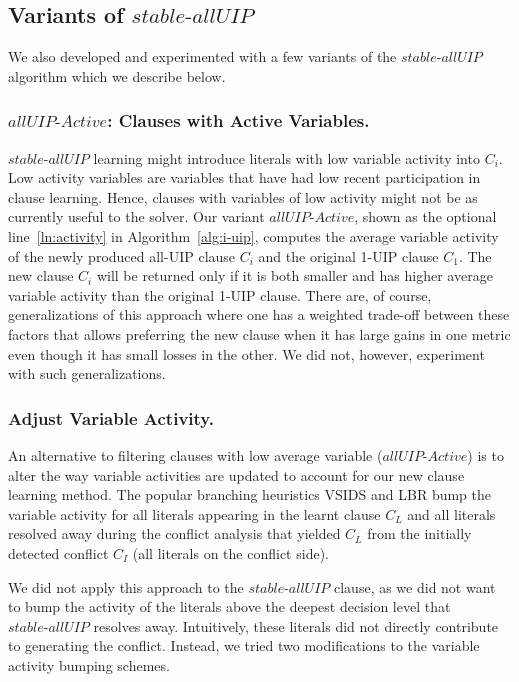 \documentclass[runningheads]{llncs}
\newcommand{\allUip}{\textit{stable-allUIP}}
\newcommand{\allUipAct}{\textit{allUIP-Active}}
\begin{document}
\subsection{Variants of $\allUip$}
We also developed and experimented with a few variants of the
$\allUip$ algorithm which we describe below.

\subsubsection{$\allUipAct$: Clauses with Active
  Variables.} \label{sec:active} $\allUip$ learning might introduce
literals with low variable activity into $C_i$. Low activity variables
are variables that have had low recent participation in clause
learning. Hence, clauses with variables of low activity might not be
as currently useful to the solver. Our variant $\allUipAct$, shown as
the optional line~\ref{ln:activity} in Algorithm~\ref{alg:i-uip},
computes the average variable activity of the newly produced all-UIP
clause $C_i$ and the original 1-UIP clause $C_1$. The new clause $C_i$
will be returned only if it is both smaller and has higher average
variable activity than the original 1-UIP clause. There are, of
course, generalizations of this approach where one has a weighted
trade-off between these factors that allows preferring the new clause
when it has large gains in one metric even though it has small losses
in the other. We did not, however, experiment with such
generalizations.

\subsubsection{Adjust Variable Activity.} \label{sec: varajust} An
alternative to filtering clauses with low average variable
($\allUipAct$) is to alter the way variable activities are updated to
account for our new clause learning method. The popular branching
heuristics VSIDS \cite{DBLP:conf/dac/MoskewiczMZZM01} and LBR
\cite{DBLP:conf/sat/LiangGPC16} bump the variable activity for all
literals appearing in the learnt clause $C_L$ and all literals
resolved away during the conflict analysis that yielded $C_L$ from the
initially detected conflict $C_I$ (all literals on the conflict side).

We did not apply this approach to the $\allUip$ clause, as we did not
want to bump the activity of the literals above the deepest decision
level that $\allUip$ resolves away. Intuitively, these literals did
not directly contribute to generating the conflict. Instead, we tried
two modifications to the variable activity bumping schemes.
\end{document}
